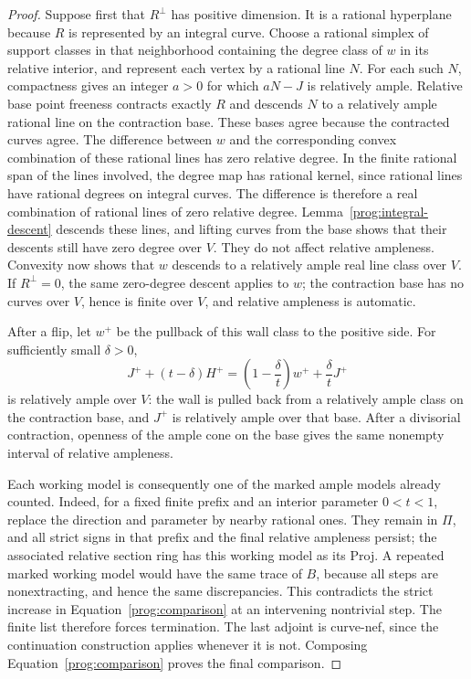 \begin{proof}
Suppose first that \(R^\perp\) has positive dimension. It is a rational
hyperplane because \(R\) is represented by an integral curve. Choose a
rational simplex of support classes in that neighborhood containing the
degree class of \(w\) in its relative interior, and represent each vertex
by a rational line \(N\). For each such \(N\), compactness gives an
integer \(a>0\) for which \(aN-J\) is relatively ample. Relative base
point freeness contracts exactly \(R\) and descends \(N\) to a relatively
ample rational line on the contraction base. These bases agree because
the contracted curves agree. The difference between \(w\) and the
corresponding convex combination of these rational lines has zero
relative degree. In the finite rational span of the lines involved, the
degree map has rational kernel, since rational lines have rational degrees
on integral curves. The difference is therefore a real combination of
rational lines of zero relative degree. Lemma~\ref{prog:integral-descent}
descends these lines, and lifting curves from the base shows that their
descents still have zero degree over \(V\). They do not affect relative
ampleness. Convexity now shows that \(w\) descends to a relatively ample
real line class over \(V\). If \(R^\perp=0\), the same zero-degree descent
applies to \(w\); the contraction base has no curves over \(V\), hence is
finite over \(V\), and relative ampleness is automatic.

After a flip, let \(w^+\) be the pullback of this wall class to the positive
side. For sufficiently small \(\delta>0\),
\[
 J^++(t-\delta)H^+
   =\left(1-\frac{\delta}{t}\right)w^+
      +\frac{\delta}{t}J^+
\]
is relatively ample over \(V\): the wall is pulled back from a relatively
ample class on the contraction base, and \(J^+\) is relatively ample over
that base. After a divisorial contraction, openness of the ample cone on
the base gives the same nonempty interval of relative ampleness.

Each working model is consequently one of the marked ample models
already counted. Indeed, for a fixed finite prefix and an interior
parameter \(0<t<1\), replace the direction and parameter by nearby
rational ones. They remain in \(\Pi\), and all strict signs in that prefix
and the final relative ampleness persist; the associated relative section
ring has this working model as its Proj. A repeated marked working model
would have the same trace of \(B\), because all steps are nonextracting,
and hence the same discrepancies. This contradicts the strict increase in
Equation~\eqref{prog:comparison} at an intervening nontrivial step. The
finite list therefore forces termination.
The last adjoint is curve-nef, since the continuation construction
applies whenever it is not.  Composing
Equation~\eqref{prog:comparison} proves the final comparison.
\end{proof}

